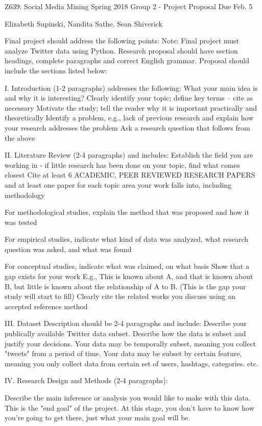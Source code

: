 Z639: Social Media Mining								
Spring 2018	Group 2 - Project Proposal 								
Due Feb. 5

Elizabeth Supinski, Nandita Sathe, Sean Shiverick

Final project should address the following points:
Note: Final project must analyze Twitter data using Python.
Research proposal should have section headings, complete paragraphs 
and correct English grammar. 
Proposal should include the sections listed below:

I. Introduction (1-2 paragraphs) addresses the following:
What your main idea is and why it is interesting?
Clearly identify your topic; define key terms – cite as necessary
Motivate the study; tell the reader why it is important practically 
and theoretically
Identify a problem, e.g., lack of previous research and explain 
how your research addresses the problem
Ask a research question that follows from the above

II. Literature Review (2-4 paragraphs) and includes:
Establish the field you are working in - if little research has 
been done on your topic, find what comes closest
Cite at least 6 ACADEMIC, PEER REVIEWED RESEARCH PAPERS and at 
least one paper for each topic area your work falls into, including 
methodology

For methodological studies, explain the method that was proposed and 
how it was tested

For empirical studies, indicate what kind of data was analyzed, what 
research question was asked, and what was found

For conceptual studies, indicate what was claimed, on what basis
Show that a gap exists for your work
E.g., This is known about A, and that is known about B, but little is 
known about the relationship of A to B.  (This is the gap your study will start to fill)
Clearly cite the related works you discuss using an accepted reference method

III. Dataset Description should be 2-4 paragraphs and include:
Describe your publically available Twitter data subset.
Describe how the data is subset and justify your decisions. 
Your data may be temporally subset, meaning you collect "tweets" 
from a period of time. Your data may be subset by certain feature, 
meaning you only collect data from certain set of users, hashtags, categories. etc.

IV. Research Design and Methods (2-4 paragraphs):

Describe the main inference or analysis you would like to make with this data. 
This is the "end goal" of the project. At this stage, you don't have to know how 
you're going to get there, just what your main goal will be. 

